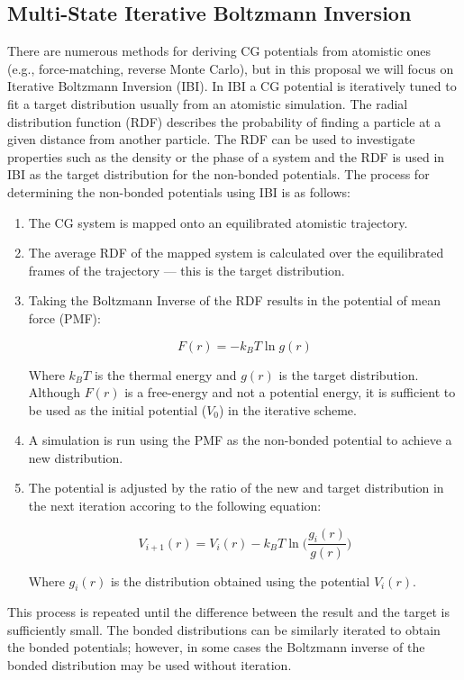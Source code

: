 \subsection*{Multi-State Iterative Boltzmann Inversion}

There are numerous methods for deriving CG potentials from atomistic ones (e.g., force-matching, reverse Monte Carlo), but in this proposal we will focus on Iterative Boltzmann Inversion (IBI).
In IBI a CG potential is iteratively tuned to fit a target distribution usually from an atomistic simulation\cite{Reith2003}.
The radial distribution function (RDF) describes the probability of finding a particle at a given distance from another particle.
The RDF can be used to investigate properties such as the density or the phase of a system and the RDF is used in IBI as the target distribution for the non-bonded potentials. %
The process for determining the non-bonded potentials using IBI is as follows:
\begin{enumerate}
    \item 
        The CG system is mapped onto an equilibrated atomistic trajectory.

    \item 
        The average RDF of the mapped system is calculated over the equilibrated frames of the trajectory --- this is the target distribution.

    \item 
        Taking the Boltzmann Inverse of the RDF results in the potential of mean force (PMF):
        
        \[
            F(r) = -k_{B}T \ln g(r)
        \]
        
        Where $k_{B}T$ is the thermal energy and $g(r)$ is the target distribution.
        Although $F(r)$ is a free-energy and not a potential energy, it is sufficient to be used as the initial potential ($V_{0}$) in the iterative scheme\cite{Reith2003}.

    \item
        A simulation is run using the PMF as the non-bonded potential to achieve a new distribution.

    \item
        The potential is adjusted by the ratio of the new and target distribution in the next iteration accoring to the following equation:
        
        \[
            V_{i+1}(r) = V_{i}(r) - k_{B}T \ln\bigg(\frac{g_{i}(r)}{g(r)}\bigg)
        \]

        Where $g_{i}(r)$ is the distribution obtained using the potential $V_{i}(r)$.

\end{enumerate}
This process is repeated until the difference between the result and the target is sufficiently small. 
The bonded distributions can be similarly iterated to obtain the bonded potentials; however, in some cases the Boltzmann inverse of the bonded distribution may be used without iteration\cite{Reith2003}.

